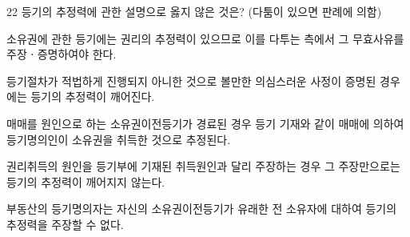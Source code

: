 \begin{question}{22}
등기의 추정력에 관한 설명으로 옳지 않은 것은? (다툼이 있으면 판례에 의함)
\begin{choices}
  \item 소유권에 관한 등기에는 권리의 추정력이 있으므로 이를 다투는 측에서 그 무효사유를 주장ㆍ증명하여야 한다.
  \item 등기절차가 적법하게 진행되지 아니한 것으로 볼만한 의심스러운 사정이 증명된 경우에는 등기의 추정력이 깨어진다.
  \item 매매를 원인으로 하는 소유권이전등기가 경료된 경우 등기 기재와 같이 매매에 의하여 등기명의인이 소유권을 취득한 것으로 추정된다.
  \item 권리취득의 원인을 등기부에 기재된 취득원인과 달리 주장하는 경우 그 주장만으로는 등기의 추정력이 깨어지지 않는다.
  \item 부동산의 등기명의자는 자신의 소유권이전등기가 유래한 전 소유자에 대하여 등기의 추정력을 주장할 수 없다.
\end{choices}
\end{question}
